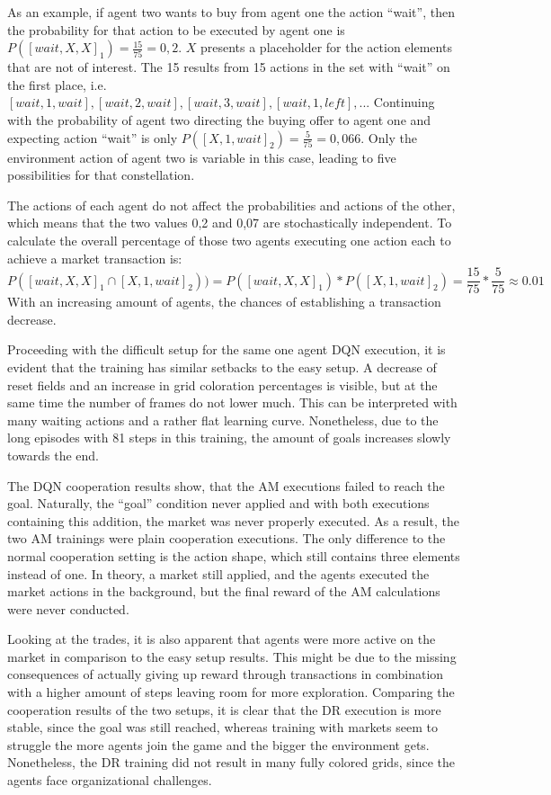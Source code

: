 As an example, if agent two wants to buy from agent one the action ``wait'', then the probability for that action to be executed by agent one is $P([wait,X,X]_1) = \frac{15}{75}=0,2$. $X$ presents a placeholder for the action elements that are not of interest. The 15 results from 15 actions in the set with ``wait'' on the first place, i.e. $[wait,1,wait], [wait,2,wait], [wait,3,wait], [wait,1,left],$... Continuing with the probability of agent two directing the buying offer to agent one and expecting action ``wait'' is only $P([X,1,wait]_2)=\frac{5}{75}=0,066$. Only the environment action of agent two is variable in this case, leading to five possibilities for that constellation. 

The actions of each agent do not affect the probabilities and actions of the other, which means that the two values 0,2 and 0,07 are stochastically independent. To calculate the overall percentage of those two agents executing one action each to achieve a market transaction is:
\begin{equation}\label{eq:prob_am}
    P([wait,X,X]_1 \cap [X,1,wait]_2))=P([wait,X,X]_1) * P([X,1,wait]_2) = \frac{15}{75}*\frac{5}{75} \approx 0.01
\end{equation}
With an increasing amount of agents, the chances of establishing a transaction decrease.

Proceeding with the difficult setup for the same one agent DQN execution, it is evident that the training has similar setbacks to the easy setup. A decrease of reset fields and an increase in grid coloration percentages is visible, but at the same time the number of frames do not lower much. This can be interpreted with many waiting actions and a rather flat learning curve. Nonetheless, due to the long episodes with 81 steps in this training, the amount of goals increases slowly towards the end.

The DQN cooperation results show, that the AM executions failed to reach the goal. Naturally, the ``goal'' condition never applied and with both executions containing this addition, the market was never properly executed. As a result, the two AM trainings were plain cooperation executions. The only difference to the normal cooperation setting is the action shape, which still contains three elements instead of one. In theory, a market still applied, and the agents executed the market actions in the background, but the final reward of the AM calculations were never conducted. 

Looking at the trades, it is also apparent that agents were more active on the market in comparison to the easy setup results. This might be due to the missing consequences of actually giving up reward through transactions in combination with a higher amount of steps leaving room for more exploration. Comparing the cooperation results of the two setups, it is clear that the DR execution is more stable, since the goal was still reached, whereas training with markets seem to struggle the more agents join the game and the bigger the environment gets. Nonetheless, the DR training did not result in many fully colored grids, since the agents face organizational challenges.


